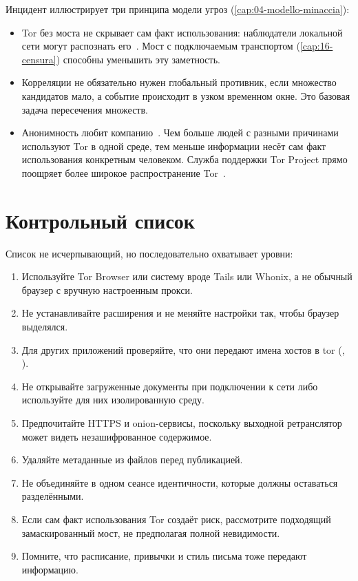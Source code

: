 Инцидент иллюстрирует три принципа модели угроз (\cref{cap:04-modello-minaccia}):
\begin{itemize}
  \item Tor без моста не скрывает сам факт использования: наблюдатели локальной сети могут распознать его~\cite{tailswarnings}. Мост с подключаемым транспортом (\cref{cap:16-censura}) способны уменьшить эту заметность.
  \item Корреляции не обязательно нужен глобальный противник, если множество кандидатов мало, а событие происходит в узком временном окне. Это базовая задача пересечения множеств.
  \item Анонимность любит компанию~\cite{dingledine2006company}. Чем больше людей с разными причинами используют Tor в одной среде, тем меньше информации несёт сам факт использования конкретным человеком. Служба поддержки Tor Project прямо поощряет более широкое распространение Tor~\cite{torsafety}.
\end{itemize}

\section{Контрольный список}\label{sec:opsec-lista}

Список не исчерпывающий, но последовательно охватывает уровни:
\begin{enumerate}
  \item Используйте Tor Browser или систему вроде Tails или Whonix, а не обычный браузер с вручную настроенным прокси.
  \item Не устанавливайте расширения и не меняйте настройки так, чтобы браузер выделялся.
  \item Для других приложений проверяйте, что они передают имена хостов в tor (, ).
  \item Не открывайте загруженные документы при подключении к сети либо используйте для них изолированную среду.
  \item Предпочитайте HTTPS и onion-сервисы, поскольку выходной ретранслятор может видеть незашифрованное содержимое.
  \item Удаляйте метаданные из файлов перед публикацией.
  \item Не объединяйте в одном сеансе идентичности, которые должны оставаться разделёнными.
  \item Если сам факт использования Tor создаёт риск, рассмотрите подходящий замаскированный мост, не предполагая полной невидимости.
  \item Помните, что расписание, привычки и стиль письма тоже передают информацию.
\end{enumerate}

